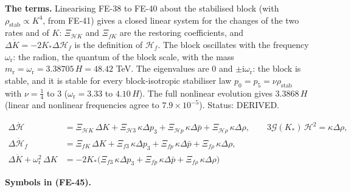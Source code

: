 \documentclass[
  10pt,
]{article}
\begin{document}
\textbf{The terms.} Linearising FE-38 to FE-40 about the stabilised
block (with \(\rho_{\mathrm{stab}} \propto K^4\), from FE-41) gives a
closed linear system for the changes of the two rates and of \(K\):
\(\Xi_{\mathcal{H}K}\) and \(\Xi_{fK}\) are the restoring coefficients,
and \(\Delta\dot K = -2K_*\Delta\mathcal{H}_f\) is the definition of
\(\mathcal{H}_f\). The block oscillates with the frequency
\(\omega_{\mathrm{r}}\): the radion, the quantum of the block scale,
with the mass
\(m_{\mathrm{r}} = \omega_{\mathrm{r}} = 3.38705\,H = 48.42\) TeV. The
eigenvalues are 0 and \(\pm\mathrm{i}\omega_{\mathrm{r}}\): the block is
stable, and it is stable for every block-isotropic stabiliser law
\(p_0 = p_5 = \nu\rho_{\mathrm{stab}}\) with \(\nu = \frac14\) to 3
(\(\omega_{\mathrm{r}} = 3.33\) to \(4.10\,H\)). The full nonlinear
evolution gives \(3.3868\,H\) (linear and nonlinear frequencies agree to
\(7.9\times10^{-5}\)). Status: DERIVED.

\[
\begin{aligned}
\Delta\dot{\mathcal{H}} &= \Xi_{\mathcal{H}K}\,\Delta K + \Xi_{\mathcal{H}3}\,\kappa\Delta p_3
 + \Xi_{\mathcal{H}p}\,\kappa\Delta\bar p + \Xi_{\mathcal{H}\rho}\,\kappa\Delta\rho,\qquad
 3\mathcal{G}(K_*)\,\mathcal{H}^2 = \kappa\Delta\rho,\\
\Delta\dot{\mathcal{H}}_f &= \Xi_{fK}\,\Delta K + \Xi_{f3}\,\kappa\Delta p_3 + \Xi_{fp}\,\kappa\Delta\bar p
 + \Xi_{f\rho}\,\kappa\Delta\rho,\\
\Delta\ddot K + \omega_{\mathrm{r}}^2\,\Delta K &= -2K_*\big(\Xi_{f3}\,\kappa\Delta p_3 +
 \Xi_{fp}\,\kappa\Delta\bar p
 + \Xi_{f\rho}\,\kappa\Delta\rho\big)
\end{aligned} \tag{FE-45}
\]

\textbf{Symbols in (FE-45).}
\end{document}
